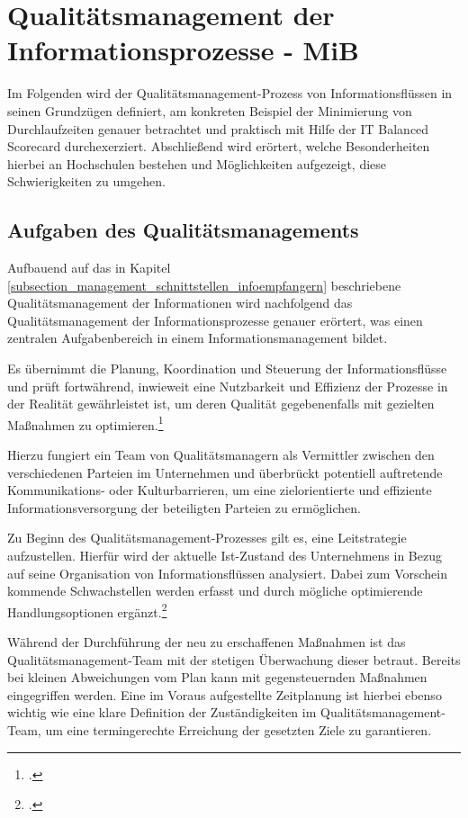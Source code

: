 \section{Qualitätsmanagement der Informationsprozesse - MiB}
\label{section_qualitaetsmanagement_der_informationsprozesse}
Im Folgenden wird der Qualitätsmanagement-Prozess von Informationsflüssen in seinen Grundzügen definiert, 
am konkreten Beispiel der Minimierung von Durchlaufzeiten genauer betrachtet und 
praktisch mit Hilfe der IT Balanced Scorecard durchexerziert. 
Abschließend wird erörtert, welche Besonderheiten hierbei an Hochschulen bestehen 
und Möglichkeiten aufgezeigt, diese Schwierigkeiten zu umgehen.

\subsection{Aufgaben des Qualitätsmanagements}
Aufbauend auf das in Kapitel \ref{subsection_management_schnittstellen_infoempfangern} beschriebene Qualitätsmanagement der Informationen 
wird nachfolgend das Qualitätsmanagement der Informationsprozesse genauer erörtert, was 
einen zentralen Aufgabenbereich in einem Informationsmanagement bildet.

Es übernimmt die Planung, Koordination und Steuerung der Informationsflüsse und prüft fortwährend, inwieweit eine Nutzbarkeit und Effizienz der Prozesse in der Realität gewährleistet ist, um deren Qualität gegebenenfalls mit gezielten Maßnahmen zu optimieren.\footcite[34 ff.]{schroder_wertorientiertes_2005}

Hierzu fungiert ein Team von Qualitätsmanagern als Vermittler zwischen den verschiedenen Parteien im Unternehmen und überbrückt potentiell auftretende Kommunikations- oder Kulturbarrieren, um eine zielorientierte und effiziente Informationsversorgung der beteiligten Parteien zu ermöglichen.

Zu Beginn des Qualitätsmanagement-Prozesses gilt es, eine Leitstrategie aufzustellen. Hierfür wird der aktuelle Ist-Zustand des Unternehmens in Bezug auf seine Organisation von Informationsflüssen analysiert. Dabei zum Vorschein kommende Schwachstellen werden erfasst und durch mögliche optimierende Handlungsoptionen ergänzt.\footcite{helmke_management_2013}

Während der Durchführung der neu zu erschaffenen Maßnahmen ist das 
Qualitätsmanagement-Team mit der stetigen Überwachung dieser betraut. 
Bereits bei kleinen Abweichungen vom Plan kann mit gegensteuernden Maßnahmen 
eingegriffen werden. Eine im Voraus aufgestellte Zeitplanung ist hierbei ebenso wichtig wie 
eine klare Definition der Zuständigkeiten im Qualitätsmanagement-Team, um eine 
termingerechte Erreichung der gesetzten Ziele zu garantieren.

